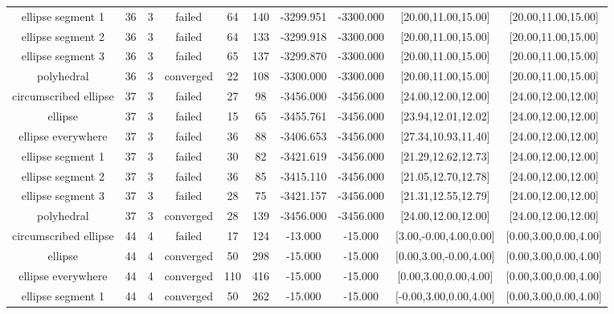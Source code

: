 \begin{tiny}
\begin{center}
\begin{longtable}{ c c c c c c c c c c }
    ellipse segment 1     &   36  &  3  &   failed   &   64  &  140  & -3299.951  & -3300.000  & [20.00,11.00,15.00] & [20.00,11.00,15.00] \\
    ellipse segment 2     &   36  &  3  &   failed   &   64  &  133  & -3299.918  & -3300.000  & [20.00,11.00,15.00] & [20.00,11.00,15.00] \\
    ellipse segment 3     &   36  &  3  &   failed   &   65  &  137  & -3299.870  & -3300.000  & [20.00,11.00,15.00] & [20.00,11.00,15.00] \\
        polyhedral        &   36  &  3  & converged  &   22  &  108  & -3300.000  & -3300.000  & [20.00,11.00,15.00] & [20.00,11.00,15.00] \\
  circumscribed ellipse   &   37  &  3  &   failed   &   27  &   98  & -3456.000  & -3456.000  & [24.00,12.00,12.00] & [24.00,12.00,12.00] \\
         ellipse          &   37  &  3  &   failed   &   15  &   65  & -3455.761  & -3456.000  & [23.94,12.01,12.02] & [24.00,12.00,12.00] \\
    ellipse everywhere    &   37  &  3  &   failed   &   36  &   88  & -3406.653  & -3456.000  & [27.34,10.93,11.40] & [24.00,12.00,12.00] \\
    ellipse segment 1     &   37  &  3  &   failed   &   30  &   82  & -3421.619  & -3456.000  & [21.29,12.62,12.73] & [24.00,12.00,12.00] \\
    ellipse segment 2     &   37  &  3  &   failed   &   36  &   85  & -3415.110  & -3456.000  & [21.05,12.70,12.78] & [24.00,12.00,12.00] \\
    ellipse segment 3     &   37  &  3  &   failed   &   28  &   75  & -3421.157  & -3456.000  & [21.31,12.55,12.79] & [24.00,12.00,12.00] \\
        polyhedral        &   37  &  3  & converged  &   28  &  139  & -3456.000  & -3456.000  & [24.00,12.00,12.00] & [24.00,12.00,12.00] \\
  circumscribed ellipse   &   44  &  4  &   failed   &   17  &  124  &  -13.000   &  -15.000   & [3.00,-0.00,4.00,0.00] & [0.00,3.00,0.00,4.00] \\
         ellipse          &   44  &  4  & converged  &   50  &  298  &  -15.000   &  -15.000   & [0.00,3.00,-0.00,4.00] & [0.00,3.00,0.00,4.00] \\
    ellipse everywhere    &   44  &  4  & converged  &  110  &  416  &  -15.000   &  -15.000   & [0.00,3.00,0.00,4.00] & [0.00,3.00,0.00,4.00] \\
    ellipse segment 1     &   44  &  4  & converged  &   50  &  262  &  -15.000   &  -15.000   & [-0.00,3.00,0.00,4.00] & [0.00,3.00,0.00,4.00] \\

\end{longtable}
\end{center}
\end{tiny}
